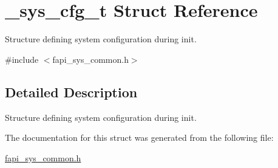 \hypertarget{struct__sys__cfg__t}{\section{\-\_\-sys\-\_\-cfg\-\_\-t Struct Reference}
\label{struct__sys__cfg__t}
}


Structure defining system configuration during init.  




{\ttfamily \#include $<$fapi\-\_\-sys\-\_\-common.\-h$>$}



\subsection{Detailed Description}
Structure defining system configuration during init. 

The documentation for this struct was generated from the following file\-:\begin{DoxyCompactItemize}
\item 
\hyperlink{fapi__sys__common_8h}{fapi\-\_\-sys\-\_\-common.\-h}\end{DoxyCompactItemize}
